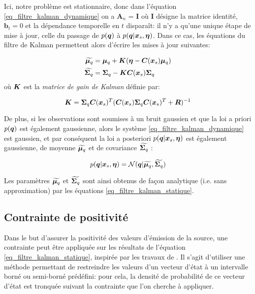  Ici, notre problème est stationnaire, donc dans l'équation \eqref{eq_filtre_kalman_dynamique} on a $\bm{A}_n$ = $\bm{I}$ où $\bm{I}$ désigne la matrice identité, $\bm{b}_t = 0$ et la dépendance temporelle en $t$ disparaît: il n'y a qu'une unique étape de mise à jour, celle du passage de $p({\bm{q}})$ à $p({\bm{q}}|{\bm{x}_s}, {\bm{\eta}})$. Dans ce cas, les équations du filtre de Kalman permettent alors d'écrire les mises à jour suivantes:
 
 \begin{equation}
 \begin{split}
 {\widetilde{{\bm{\mu}_q}}} & = {\bm{\mu}_q} + {\bm{K}}({\bm{\eta}} - {\bm{C}}({\bm{x}_s}){\bm{\mu}_q}) \\
 {\widetilde{{\bm{\Sigma}_q}}} & = {\bm{\Sigma}_q} - {\bm{K}}{\bm{C}}({\bm{x}_s}){\bm{\Sigma}_q}
 \end{split}
 \label{eq_filtre_kalman_statique}
 \end{equation}
 où ${\bm{K}}$ est la \textit{matrice de gain de Kalman} définie par:
 
 \begin{equation}
 {\bm{K}} = {\bm{\Sigma}_q}{\bm{C}}({\bm{x}_s})^T({\bm{C}}({\bm{x}_s}){\bm{\Sigma}_q}{\bm{C}}({\bm{x}_s})^T + {\bm{R}})^{-1}
 \end{equation}
 
 
 
 
 
  De plus, si les observations sont soumises à un bruit gaussien et que la loi a priori $p({\bm{q}})$ est également gaussienne, alors le système \eqref{eq_filtre_kalman_dynamique} est gaussien, et par conséquent la loi a posteriori $p({\bm{q}}|{\bm{x}_s}, {\bm{\eta}})$ est également gaussienne, de moyenne ${\widetilde{{\bm{\mu}_q}}}$ et de covariance $ {\widetilde{{\bm{\Sigma}_q}}}$ : 
  
  \begin{equation}
  p({\bm{q}}|{\bm{x}_s}, {\bm{\eta}}) = \mathcal{N}({\bm{q}} | {\widetilde{{\bm{\mu}_q}}}, {\widetilde{{\bm{\Sigma}_q}}})
  \label{eq_AE_13}
  \end{equation}
  
  Les paramètres ${\widetilde{{\bm{\mu}_q}}}$ et ${\widetilde{{\bm{\Sigma}_q}}}$ sont ainsi obtenus de façon analytique (i.e. sans approximation) par les équations \eqref{eq_filtre_kalman_statique}. 

\subsection{Contrainte de positivité}

Dans le but d'assurer la positivité des valeurs d'émission de la source, une contrainte peut être appliquée sur les résultats de l'équation \eqref{eq_filtre_kalman_statique}, inspirée par les travaux de \cite{Simon2010}. Il s'agit d'utiliser une méthode permettant de restreindre les valeurs d'un vecteur d'état à un intervalle borné ou semi-borné prédéfini: pour cela, la densité de probabilité de ce vecteur d'état est tronquée suivant la contrainte que l'on cherche à appliquer. \\

